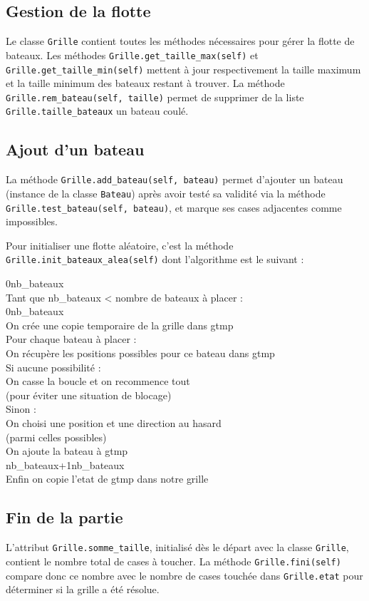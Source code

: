 \subsection{Gestion de la flotte}
Le classe \texttt{Grille} contient toutes les méthodes nécessaires pour gérer la flotte de bateaux. Les méthodes \texttt{Grille.get\_taille\_max(self)} et \texttt{Grille.get\_taille\_min(self)} mettent à jour respectivement la taille maximum et la taille minimum des bateaux restant à trouver. La méthode \texttt{Grille.rem\_bateau(self, taille)} permet de supprimer de la liste \texttt{Grille.taille\_bateaux} un bateau coulé.

\subsection{Ajout d'un bateau}
La méthode \texttt{Grille.add\_bateau(self, bateau)} permet d'ajouter un bateau (instance de la classe \texttt{Bateau}) après avoir testé sa validité via la méthode \texttt{Grille.test\_bateau(self, bateau)}, et marque ses cases adjacentes comme impossibles.

Pour initialiser une flotte aléatoire, c'est la méthode \texttt{Grille.init\_bateaux\_alea(self)} dont l'algorithme est le suivant :

\begin{algo1}
0\sto nb\_bateaux\\
Tant que nb\_bateaux < nombre de bateaux à placer :\\
 0\sto nb\_bateaux\\
 On crée une copie temporaire de la grille dans gtmp\\
 Pour chaque bateau à placer :\\
 On récupère les positions possibles pour ce bateau dans gtmp\\
 Si aucune possibilité :\\
 On casse la boucle et on recommence tout\\
 (pour éviter une situation de blocage)\\
 Sinon :\\
 On choisi une position et une direction au hasard\\
 (parmi celles possibles)\\
 On ajoute la bateau à gtmp\\
 nb\_bateaux+1\sto nb\_bateaux\\
Enfin on copie l'etat de gtmp dans notre grille \\
\end{algo1}

\subsection{Fin de la partie}
L'attribut \texttt{Grille.somme\_taille}, initialisé dès le départ avec la classe \texttt{Grille}, contient le nombre total de cases à toucher. La méthode \texttt{Grille.fini(self)} compare donc ce nombre avec le nombre de cases touchée dans \texttt{Grille.etat} pour déterminer si la grille a été résolue.